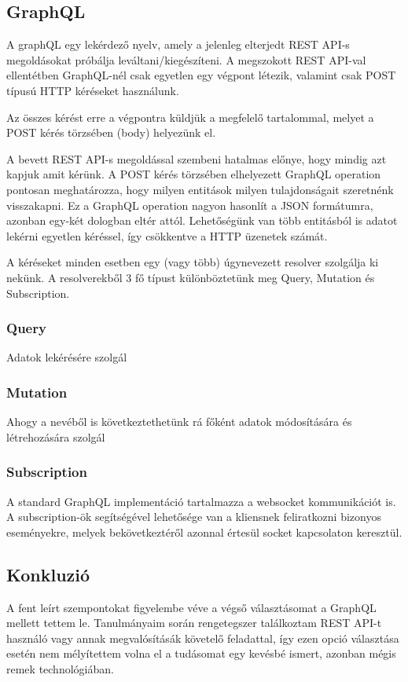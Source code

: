 \subsection{GraphQL}

A graphQL egy lekérdező nyelv, amely a jelenleg elterjedt REST API-s megoldásokat próbálja leváltani/kiegészíteni. A megszokott REST API-val ellentétben GraphQL-nél csak egyetlen egy végpont létezik, valamint csak POST típusú HTTP kéréseket használunk. 

Az összes kérést erre a végpontra küldjük a megfelelő tartalommal, melyet a POST kérés törzsében (body) helyezünk el.

A bevett REST API-s megoldással szembeni hatalmas előnye, hogy mindig azt kapjuk amit kérünk. A POST kérés törzsében elhelyezett GraphQL operation pontosan meghatározza, hogy milyen entitások milyen tulajdonságait szeretnénk visszakapni. Ez a GraphQL operation nagyon hasonlít a JSON formátumra, azonban egy-két dologban eltér attól. Lehetőségünk van több entitásból is adatot lekérni egyetlen kéréssel, így csökkentve a HTTP üzenetek számát.

A kéréseket minden esetben egy (vagy több) úgynevezett resolver szolgálja ki nekünk. 
A resolverekből 3 fő típust különböztetünk meg Query, Mutation és Subscription.

\subsubsection{Query}
Adatok lekérésére szolgál
  
\subsubsection{Mutation}
Ahogy a nevéből is következtethetünk rá főként adatok módosítására és létrehozására szolgál
  

\subsubsection{Subscription}
A standard GraphQL implementáció tartalmazza a websocket kommunikációt is. A subscription-ök segítségével lehetősége van a kliensnek feliratkozni bizonyos eseményekre, melyek bekövetkeztéről azonnal értesül socket kapcsolaton keresztül.

\subsection{Konkluzió}
A fent leírt szempontokat figyelembe véve a végső választásomat a GraphQL mellett tettem le.
Tanulmányaim során rengetegszer találkoztam REST API-t használó vagy annak megvalósításák követelő feladattal, így ezen opció választása esetén nem mélyítettem volna el a tudásomat egy kevésbé ismert, azonban mégis remek technológiában.

